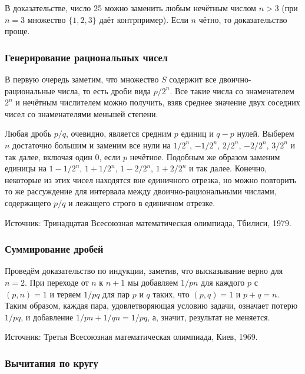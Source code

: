 В доказательстве, число 25 можно заменить любым нечётным числом $n> 3$ (при $n=3$ множество $\{1,2,3\}$ даёт контрпример).
Если $n$ чётно, то доказательство проще. 


\subsubsection*{Генерирование рациональных чисел}%

В первую очередь заметим, что множество $S$ содержит все двоично-рациональные числа, 
то есть дроби вида $p/2^n$.
Все такие числа со знаменателем $2^n$ и нечётным числителем можно получить, взяв среднее значение двух соседних чисел со знаменателями меньшей степени.

Любая дробь $p/q$, очевидно, является средним $p$ единиц и $q-p$ нулей.
Выберем $n$ достаточно большим и заменим все нули на $1/2^n$, $-1/2^n$, $2/2^n$, $-2/2^n$, $3/2^n$ и так далее, включая один $0$, если $p$ нечётное.
Подобным же образом заменим единицы на $1-1/2^n$, $1+1/2^n$, $1-2/2^n$, $1+2/2^n$ и так далее.
Конечно, некоторые из этих чисел находятся вне единичного отрезка, но можно повторить то же рассуждение для интервала между двоично-рациональными числами, содержащего $p/q$ и лежащего строго в единичном отрезке.%
\heart

Источник: Тринадцатая Всесоюзная математическая олимпиада, Тбилиси, 1979.

\subsubsection*{Суммирование дробей}%

Проведём доказательство по индукции, заметив, что высказывание верно для $n=2$.
При переходе от $n$ к $n+1$ мы добавляем $1/pn$ для каждого $p$ с $(p,n)=1$ и теряем $1/pq$ для пар $p$ и $q$ таких, что $(p,q)=1$ и $p+q=n$.
Таким образом, каждая пара, удовлетворяющая условию задачи, означает потерю $1/pq$, и добавление $1/pn+1/qn=1/pq$, а, значит, результат не меняется.\heart

Источник: Третья Всесоюзная математическая олимпиада, Киев, 1969.

\subsubsection*{Вычитания по кругу}%

